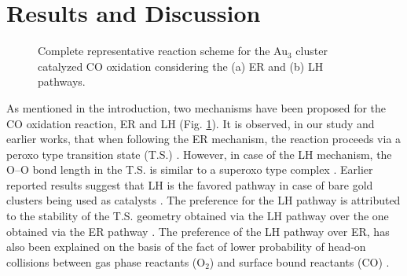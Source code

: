 \section{Results and Discussion}
\begin{figure}[t]
        \centering
\caption{Complete representative reaction scheme for the Au$_3$ cluster catalyzed CO oxidation considering the (a) ER and (b) LH pathways.} \label{fig:rxn_mech}
\end{figure}
As mentioned in the introduction, two mechanisms have been proposed for the CO oxidation reaction, ER and LH (Fig. \ref{fig:rxn_mech}). It is observed, in our study \cite{raipccp2015} and earlier works, that when following the ER mechanism, the reaction proceeds via a peroxo type transition state (T.S.) \cite{ping2010}. However, in case of the LH mechanism, the O--O bond length in the T.S. is similar to a superoxo type complex \cite{zhang2007,lopez2002,mavrikakis2003,liu2002,liu2003,ping2010}. 
Earlier reported results suggest that LH is the favored pathway in case of bare gold clusters being used as catalysts \cite{ping2010,Olga2010}. The preference for the LH pathway is attributed to the stability of the T.S. geometry obtained via the LH pathway over the one obtained via the ER pathway \cite{ping2010}. The preference of the LH pathway over ER, has also been explained on the basis of the fact of lower probability of head-on collisions between gas phase reactants (O$_2$) and surface bound reactants (CO) \cite{Jena2012,Olga2010,ping2010}.

